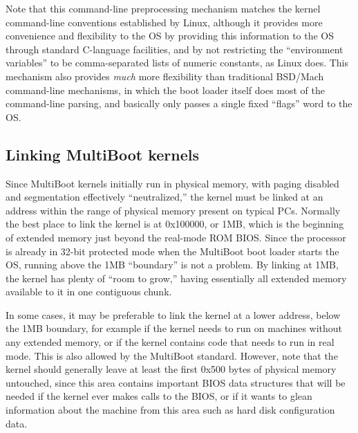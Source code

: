 Note that this command-line preprocessing mechanism
matches the kernel command-line conventions established by Linux,
although it provides more convenience and flexibility to the OS
by providing this information to the OS
through standard C-language facilities,
and by not restricting the ``environment variables''
to be comma-separated lists of numeric constants, as Linux does.
This mechanism also provides \emph{much} more flexibility
than traditional BSD/Mach command-line mechanisms,
in which the boot loader itself does most of the command-line parsing,
and basically only passes a single fixed ``flags'' word to the OS.

\subsection{Linking MultiBoot kernels}

Since MultiBoot kernels initially run in physical memory,
with paging disabled and segmentation effectively ``neutralized,''
the kernel must be linked at an address
within the range of physical memory present on typical PCs.
Normally the best place to link the kernel is at 0x100000, or 1MB,
which is the beginning of extended memory
just beyond the real-mode ROM BIOS\@.
Since the processor is already in 32-bit protected mode
when the MultiBoot boot loader starts the OS,
running above the 1MB ``boundary'' is not a problem.
By linking at 1MB,
the kernel has plenty of ``room to grow,''
having essentially all extended memory available to it
in one contiguous chunk.

In some cases, it may be preferable to link the kernel at a lower address,
below the 1MB boundary,
for example if the kernel needs to run on machines without any extended memory,
or if the kernel contains code that needs to run in real mode.
This is also allowed by the MultiBoot standard.
However, note that the kernel should generally leave
at least the first 0x500 bytes of physical memory untouched,
since this area contains important BIOS data structures
that will be needed if the kernel ever makes calls to the BIOS,
or if it wants to glean information about the machine from this area
such as hard disk configuration data.

